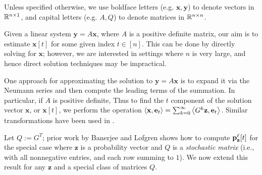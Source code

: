 Unless specified otherwise, we use boldface letters (e.g. $\mathbf{x},\mathbf{y}$) to denote vectors in $\mathbb{R}^{n\times 1}$, and capital letters (e.g. $A,Q$) to denote matrices in $\mathbb{R}^{n\times n}$.


Given a linear system $\mathbf{y} = A\mathbf{x}$, where $A$ is a positive definite matrix, our aim is to estimate $\mathbf{x}[t]$ for some given index $t\in[n]$. 
This can be done by directly solving for $\mathbf{x}$; however, we are interested in settings where $n$ is very large, and hence direct solution techniques may be impractical. 

One approach for approximating the solution to $\mathbf{y} = A\mathbf{x}$ is to expand it via the Neumann series and then compute the leading terms of the summation.
In particular, if $A$ is positive definite, 
Thus to find the $t$ component of the solution vector $\mathbf{x}$, or $\mathbf{x}[t]$, we perform the operation $\left< \mathbf{x}, \mathbf{e}_t \right> = \sum_{k=0}^\infty \left< G^k \mathbf{z}, \mathbf{e}_t \right>$. 
Similar transformations have been used in \cite{dimov2015new, lee2014asynchronous, wu2016multi}.

Let $Q:=G^T$; prior work by Banerjee and Lofgren \cite{banerjee2015fast} shows how to compute ${\mathbf{p}}_\mathbf{z}^{\ell}[t]$ for the special case where $\mathbf{z}$ is a probability vector and $Q$ is a \emph{stochastic matrix} (i.e., with all nonnegative entries, and each row summing to $1$). 
We now extend this result for any $\mathbf{z}$ and a special class of matrices $Q$.

